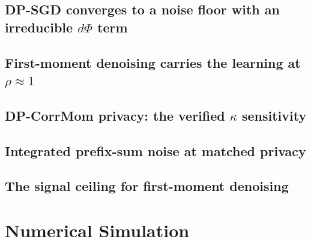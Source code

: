\documentclass[11pt]{article}
\theoremstyle{plain}
\theoremstyle{definition}
\theoremstyle{remark}
\begin{document}


\subsection{DP-SGD converges to a noise floor with an irreducible \texorpdfstring{$d\Phi$}{dPhi} term}
\label{sec:theory-floor}



\subsection{First-moment denoising carries the learning at \texorpdfstring{$\rho\approx 1$}{rho approx 1}}
\label{sec:theory-firstmoment}



\subsection{DP-CorrMom privacy: the verified \texorpdfstring{$\kappa$}{kappa} sensitivity}
\label{sec:theory-corrmom}



\subsection{Integrated prefix-sum noise at matched privacy}
\label{sec:theory-prefix}



\subsection{The signal ceiling for first-moment denoising}
\label{sec:theory-ceiling}



\section{Numerical Simulation}
\label{sec:numerical}
\end{document}
